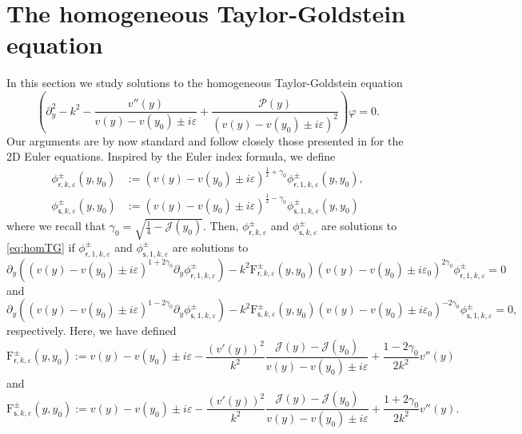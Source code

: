 \documentclass[11pt,reqno]{amsproc}
\theoremstyle{definition}
\numberwithin{equation}{section}
\newcommand{\cJ}{{\mathcal{J}}}
\newcommand{\sr}{{\mathsf{r}}}
\newcommand{\s}{{\mathsf{s}}}
\newcommand{\ep}{\varepsilon}
\renewcommand{\P}{{\mathcal{P}}}
\newcommand{\p}{\partial}
\renewcommand{\l}{\left}
\renewcommand{\r}{\right}
\begin{document}
\section{The homogeneous Taylor-Goldstein equation}\label{sec:homTG}

In this section we study solutions to the homogeneous Taylor-Goldstein equation
\begin{equation}\tag{hTG}\label{eq:homTG}
\l( \p_y^2 - k^2 -\frac{v''(y)}{v(y)-v(y_0)\pm i\ep}+\frac{\P(y)}{(v(y)-v(y_0)\pm i\ep)^2}\r) \varphi=0.
\end{equation}
Our arguments are by now standard and follow closely those presented in \cite{WZZ18} for the 2D Euler equations. Inspired by the Euler index formula, we define
\begin{equation}\label{eq:defphisigma}
\begin{split}
\phi_{\sr,k,\ep}^\pm(y,y_0) &:= (v(y) - v(y_0) \pm i\ep)^{\frac12+\gamma_0}\phi_{\sr,1,k,\ep}^\pm(y,y_0) , \\
\phi_{\s,k,\ep}^\pm(y,y_0) &:= (v(y) - v(y_0) \pm i\ep)^{\frac12-\gamma_0}\phi_{\s,1,k,\ep}^\pm(y,y_0)
\end{split}
\end{equation}
where we recall that $\gamma_0 = \sqrt{\frac14 - \cJ(y_0)}$. Then, $\phi_{\sr,k,\ep}^\pm$ and $\phi_{\s,k,\ep}^\pm$ are solutions to \eqref{eq:homTG} if $ \phi_{\sr,1,k,\ep}^\pm$ and $ \phi_{\s,1,k,\ep}^\pm$ are solutions to 
\begin{equation}\label{eq:homTGphir1}
\partial_y \left( (v(y) - v(y_0) \pm i\ep)^{1+2\gamma_0}\partial_y \phi_{\sr,1,k,\ep}^\pm \right) - k^2 \mathrm{F}_{\sr,k,\ep}^\pm(y,y_0)(v(y) - v(y_0) \pm i\ep_0)^{2\gamma_0}\phi_{\sr,1,k,\ep}^\pm = 0
\end{equation}
and
\begin{equation}\label{eq:homTGphis1}
\partial_y \left( (v(y) - v(y_0) \pm i\ep)^{1-2\gamma_0}\partial_y \phi_{\s,1,k,\ep}^\pm \right) - k^2 \mathrm{F}_{\s,k,\ep}^\pm(y,y_0)(v(y) - v(y_0) \pm i\ep_0)^{-2\gamma_0}\phi_{\s,1,k,\ep}^\pm = 0,
\end{equation}
respectively. Here, we have defined
\begin{equation}\label{eq:defFsr}
\mathrm{F}_{\sr,k,\ep}^\pm(y,y_0) := v(y) - v(y_0) \pm i\ep - \frac{(v'(y))^2}{k^2}\frac{\cJ(y) - \cJ(y_0)}{v(y) - v(y_0) \pm i\ep} +  \frac{1-2\gamma_0}{2k^2}v''(y)
\end{equation}
and
\begin{equation}\label{eq:defFs}
\mathrm{F}_{\s,k,\ep}^\pm(y,y_0) := v(y) - v(y_0) \pm i\ep - \frac{(v'(y))^2}{k^2}\frac{\cJ(y) - \cJ(y_0)}{v(y) - v(y_0) \pm i\ep} + \frac{1+2\gamma_0}{2k^2}v''(y).
\end{equation}
\end{document}
